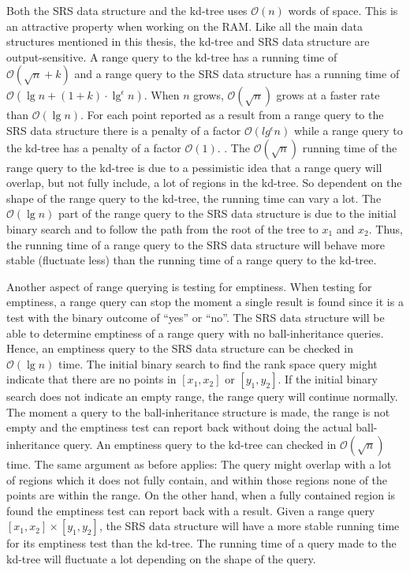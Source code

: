Both the SRS data structure and the kd-tree uses $\mathcal{O}(n)$ words of space. This is an attractive property when working on the RAM. Like all the main data structures mentioned in this thesis, the kd-tree and SRS data structure are output-sensitive. A range query to the kd-tree has a running time of $\mathcal{O}(\sqrt{n}+k)$ and a range query to the SRS data structure has a running time of $\mathcal{O}(\lg n + (1+k)\cdot\lg^\epsilon n)$. When $n$ grows, $\mathcal{O}(\sqrt{n})$ grows at a faster rate than $\mathcal{O}(\lg n)$. For each point reported as a result from a range query to the SRS data structure there is a penalty of a factor $\mathcal{O}(lg^\epsilon n)$ while a range query to the kd-tree has a penalty of a factor $\mathcal{O}(1)$. . The $\mathcal{O}(\sqrt{n})$ running time of the range query to the kd-tree is due to a pessimistic idea that a range query will overlap, but not fully include, a lot of regions in the kd-tree. So dependent on the shape of the range query to the kd-tree, the running time can vary a lot. The $\mathcal{O}(\lg n)$ part of the range query to the SRS data structure is due to the initial binary search and to follow the path from the root of the tree to $x_1$ and $x_2$. Thus, the running time of a range query to the SRS data structure will behave more stable (fluctuate less) than the running time of a range query to the kd-tree. 



Another aspect of range querying is testing for emptiness. When testing for emptiness, a range query can stop the moment a single result is found since it is a test with the binary outcome of ``yes'' or ``no''. The SRS data structure will be able to determine emptiness of a range query with no ball-inheritance queries. Hence, an emptiness query to the SRS data structure can be checked in $\mathcal{O}(\lg n)$ time. The initial binary search to find the rank space query might indicate that there are no points in $[x_1, x_2]$ or $[y_1, y_2]$. If the initial binary search does not indicate an empty range, the range query will continue normally. The moment a query to the ball-inheritance structure is made, the range is not empty and the emptiness test can report back without doing the actual ball-inheritance query. An emptiness query to the kd-tree can checked in $\mathcal{O}(\sqrt{n})$ time. The same argument as before applies: The query might overlap with a lot of regions which it does not fully contain, and within those regions none of the points are within the range. On the other hand, when a fully contained region is found the emptiness test can report back with a result. Given a range query $[x_1, x_2] \times [y_1, y_2]$, the SRS data structure will have a more stable running time for its emptiness test than the kd-tree. The running time of a query made to the kd-tree will fluctuate a lot depending on the shape of the query.

